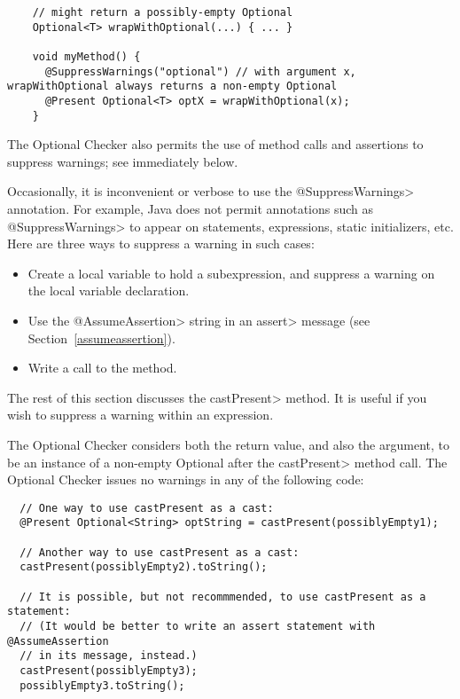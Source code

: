 \begin{smaller}
\begin{Verbatim}
    // might return a possibly-empty Optional
    Optional<T> wrapWithOptional(...) { ... }

    void myMethod() {
      @SuppressWarnings("optional") // with argument x, wrapWithOptional always returns a non-empty Optional
      @Present Optional<T> optX = wrapWithOptional(x);
    }
\end{Verbatim}
\end{smaller}

The Optional Checker also permits the use of method calls and assertions to
suppress warnings; see immediately below.



Occasionally, it is inconvenient or
verbose to use the \<@SuppressWarnings> annotation.  For example, Java does
not permit annotations such as \<@SuppressWarnings> to appear on
statements, expressions, static initializers, etc.
Here are three ways to suppress a warning in such cases:
\begin{itemize}
\item
  Create a local variable to hold a subexpression, and
  suppress a warning on the local variable declaration.
\item
  Use the \<@AssumeAssertion> string in
  an \<assert> message (see Section~\ref{assumeassertion}).
\item
  Write a call to the
   method.
\end{itemize}

The rest of this section discusses the \<castPresent> method.
It is useful if you wish to suppress a warning within an expression.

The Optional Checker considers both the return value, and also the
argument, to be an instance of a non-empty Optional after the \<castPresent>
method call.
The Optional Checker issues no warnings in any of the following
code:

\begin{Verbatim}
  // One way to use castPresent as a cast:
  @Present Optional<String> optString = castPresent(possiblyEmpty1);

  // Another way to use castPresent as a cast:
  castPresent(possiblyEmpty2).toString();

  // It is possible, but not recommmended, to use castPresent as a statement:
  // (It would be better to write an assert statement with @AssumeAssertion
  // in its message, instead.)
  castPresent(possiblyEmpty3);
  possiblyEmpty3.toString();
\end{Verbatim}

